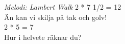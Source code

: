 {\footnotesize\textit{Melodi: Lambert Walk}}
\vspace{10pt}
2 * 7 1/2 = 12\\
Än kan vi skilja på tak och golv!\\
2 * 5 = 7\\
Hur i helvete räknar du?
